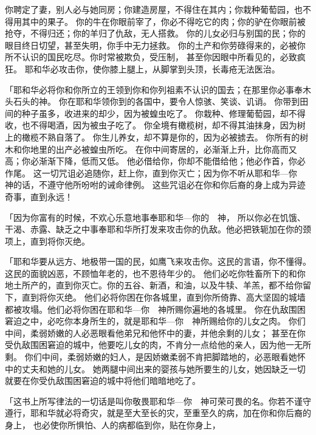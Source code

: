 {你聘定了妻，别人必与她同房；你建造房屋，不得住在其内；你栽种葡萄园，也不得用其中的果子。
你的牛在你眼前宰了，你必不得吃它的肉；你的驴在你眼前被抢夺，不得归还；你的羊归了仇敌，无人搭救。
你的儿女必归与别国的民；你的眼目终日切望，甚至失明，你手中无力拯救。
你的土产和你劳碌得来的，必被你所不认识的国民吃尽。你时常被欺负，受压制，
甚至你因眼中所看见的，必致疯狂。
耶和华必攻击你，使你膝上腿上，从脚掌到头顶，长毒疮无法医治。
\par }{\PP {}「耶和华必将你和你所立的王领到你和你列祖素不认识的国去；在那里你必事奉木头石头的神。
你在耶和华领你到的各国中，要令人惊骇、笑谈、讥诮。
你带到田间的种子虽多，收进来的却少，因为被蝗虫吃了。
你栽种、修理葡萄园，却不得收{}，也不得喝{}酒，因为被虫子吃了。
你全境有橄榄树，却不得其油抹身，因为树上的橄榄不熟自落了。
你生儿养女，却不算是你的，因为必被掳去。
你所有的树木和你地里的出产必被蝗虫所吃。
在你中间寄居的，必渐渐上升，比你高而又高；你必渐渐下降，低而又低。
他必借给你，你却不能借给他；他必作首，你必作尾。
这一切咒诅必追随你，赶上你，直到你灭亡；因为你不听从耶和华—你　神的话，不遵守他所吩咐的诫命律例。
这些咒诅必在你和你后裔的身上成为异迹奇事，直到永远！
\par }{\PP {}「因为你富有的时候，不欢心乐意地事奉耶和华—你的　神，
所以你必在饥饿、干渴、赤露、缺乏之中事奉耶和华所打发来攻击你的仇敌。他必把铁轭加在你的颈项上，直到将你灭绝。
\par }{\PP {}「耶和华要从远方、地极带一国的民，如鹰飞来攻击你。这民的言语，你不懂得。
这民的面貌凶恶，不顾恤年老的，也不恩待年少的。
他们必吃你牲畜所下的和你地土所产的，直到你灭亡。你的五谷、新酒，和油，以及牛犊、羊羔，都不给你留下，直到将你灭绝。
他们必将你困在你各城里，直到你所倚靠、高大坚固的城墙都被攻塌。他们必将你困在耶和华—你　神所赐你遍地的各城里。
你在仇敌围困窘迫之中，必吃你本身所生的，就是耶和华—你　神所赐给你的儿女之肉。
你们中间，柔弱娇嫩的人必恶眼看他弟兄和他怀中的妻，并他余剩的儿女；
甚至在你受仇敌围困窘迫的城中，他要吃儿女的肉，不肯分一点给他的亲人，因为他一无所剩。
你们中间，柔弱娇嫩的妇人，是因娇嫩柔弱不肯把脚踏地的，必恶眼看她怀中的丈夫和她的儿女。
她两腿中间出来的婴孩与她所要生的儿女，她因缺乏一切就要在你受仇敌围困窘迫的城中将他们暗暗地吃了。
\par }{\PP {}「这书上所写律法的一切话是叫你敬畏耶和华—你　神可荣可畏的名。你若不谨守遵行，耶和华就必将奇灾，就是至大至长的灾，至重至久的病，加在你和你后裔的身上，
也必使你所惧怕、{}人的病都临到你，贴在你身上，
}
